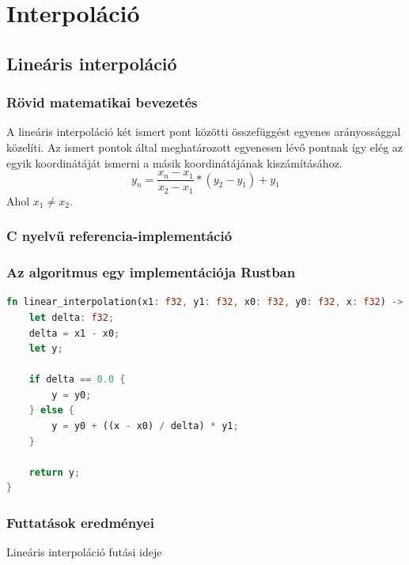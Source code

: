 \section{Interpoláció}

\subsection{Lineáris interpoláció}
\subsubsection{Rövid matematikai bevezetés}
A lineáris interpoláció két ismert pont közötti összefüggést egyenes arányossággal közelíti. Az ismert pontok által meghatározott egyenesen lévő pontnak így elég az egyik koordinátáját ismerni a másik koordinátájának kiszámításához.
\[ y_n = \frac{x_n - x_1}{x_2 - x_1} * (y_2 - y_1) + y_1 \]
Ahol $x_1 \neq x_2$.
\subsubsection{C nyelvű referencia-implementáció}
\subsubsection{Az algoritmus egy implementációja Rustban}
\begin{lstlisting}[language=Rust]
fn linear_interpolation(x1: f32, y1: f32, x0: f32, y0: f32, x: f32) -> f32 {
    let delta: f32;
    delta = x1 - x0;
    let y;

    if delta == 0.0 {
        y = y0;
    } else {
        y = y0 + ((x - x0) / delta) * y1;
    }

    return y;
}
\end{lstlisting}
\subsubsection{Futtatások eredményei}
Lineáris interpoláció futási ideje

